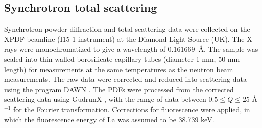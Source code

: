 \documentclass[twoside,twocolumn,9pt]{article}
\begin{document}
\subsection{Synchrotron total scattering}
Synchrotron powder diffraction and total scattering data were collected on the XPDF beamline (I15-1 instrument) at the Diamond Light Source (UK).
The X-rays were monochromatized to give a wavelength of 0.161669~\AA.
The sample was sealed into thin-walled borosilicate capillary tubes (diameter 1 mm, 50 mm length) for measurements at the same temperatures as the neutron beam measurements. The raw data  were corrected and reduced into scattering data using the program DAWN \cite{Basham:2015cf}.
The PDFs were processed from the corrected scattering data using GudrunX \cite{Soper:2011fda,Soper:2012vs}, with the range of data between $0.5 \le Q \le 25$ \AA$^{-1}$ for the Fourier transformation. Corrections for fluorescence were applied, in which the fluorescence energy of La was assumed to be 38.739 keV.
\end{document}
